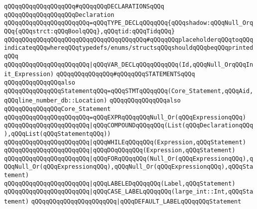 \newline
\newline
\verb|qQQqqQQqqQQqqQQqqQQq#qQQqqQQqDECLARATIONSqQQq|\newline
\newline
\verb|qQQqqQQqqQQqqQQqqQQqDeclaration|\newline
\verb|qQQqqQQqqQQqqQQqqQQqqQQq=qQQqTYPE_DECLqQQqqQQq{qQQqshadow:qQQqNull_OrqQQq{qQQqstrct:qQQqBoolqQQq},qQQqtid:qQQqTidqQQq}|\newline
\verb|qQQqqQQqqQQqqQQqqQQqqQQqqQQqqQQqqQQqqQQq#qQQqqQQqplaceholderqQQqtoqQQqindicateqQQqwhereqQQqtypedefs/enums/structsqQQqshouldqQQqbeqQQqprintedqQQq|\newline
\verb|qQQqqQQqqQQqqQQqqQQqqQQq|\verb#|qQQqVAR_DECLqQQqqQQqqQQq(Id,qQQqNull_OrqQQqInit_Expression)#\newline
\newline
\newline
\verb|qQQqqQQqqQQqqQQq#qQQqqQQqSTATEMENTSqQQq|\newline
\newline
\verb|qQQqqQQqqQQqqQQqalso|\newline
\verb|qQQqqQQqqQQqqQQqStatementqQQq=qQQqSTMTqQQqqQQq(Core_Statement,qQQqAid,qQQqline_number_db::Location)|\newline
\newline
\verb|qQQqqQQqqQQqqQQqalso|\newline
\verb|qQQqqQQqqQQqqQQqCore_Statement|\newline
\verb|qQQqqQQqqQQqqQQqqQQqqQQq=qQQqEXPRqQQqqQQqNull_Or(qQQqExpressionqQQq)|\newline
\verb|qQQqqQQqqQQqqQQqqQQqqQQq|\verb#|qQQqCOMPOUNDqQQqqQQq(List(qQQqDeclarationqQQq),qQQqList(qQQqStatementqQQq))#\newline
\verb|qQQqqQQqqQQqqQQqqQQqqQQq|\verb#|qQQqWHILEqQQqqQQq(Expression,qQQqStatement)#\newline
\verb|qQQqqQQqqQQqqQQqqQQqqQQq|\verb#|qQQqDOqQQqqQQq(Expression,qQQqStatement)#\newline
\verb|qQQqqQQqqQQqqQQqqQQqqQQq|\verb#|qQQqFORqQQqqQQq(Null_Or(qQQqExpressionqQQq),qQQqNull_Or(qQQqExpressionqQQq),qQQqNull_Or(qQQqExpressionqQQq),qQQqStatement)#\newline
\verb|qQQqqQQqqQQqqQQqqQQqqQQq|\verb#|qQQqLABELEDqQQqqQQq(Label,qQQqStatement)#\newline
\verb|qQQqqQQqqQQqqQQqqQQqqQQq|\verb#|qQQqCASE_LABELqQQqqQQq(large_int::Int,qQQqStatement)#\newline
\verb|qQQqqQQqqQQqqQQqqQQqqQQq|\verb#|qQQqDEFAULT_LABELqQQqqQQqStatement#\newline
